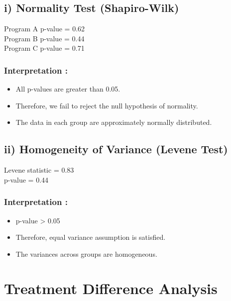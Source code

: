 \documentclass[
]{article}
\begin{document}
\subsection{i) Normality Test
(Shapiro-Wilk)}\label{i-normality-test-shapiro-wilk}

Program A p-value = 0.62\\
Program B p-value = 0.44\\
Program C p-value = 0.71

\subsubsection{Interpretation :}\label{interpretation-10}

\begin{itemize}
\item
  All p-values are greater than 0.05.
\item
  Therefore, we fail to reject the null hypothesis of normality.
\item
  The data in each group are approximately normally distributed.
\end{itemize}

\subsection{\texorpdfstring{\textbf{ii) Homogeneity of Variance (Levene
Test)}}{ii) Homogeneity of Variance (Levene Test)}}\label{ii-homogeneity-of-variance-levene-test}

Levene statistic = 0.83\\
p-value = 0.44

\subsubsection{Interpretation :}\label{interpretation-11}

\begin{itemize}
\item
  p-value \textgreater{} 0.05
\item
  Therefore, equal variance assumption is satisfied.
\item
  The variances across groups are homogeneous.
\end{itemize}

\section{Treatment Difference
Analysis}\label{treatment-difference-analysis}
\end{document}
